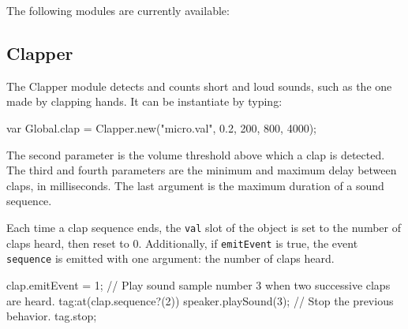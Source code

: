 The following modules are currently available:

\subsection{Clapper}
The Clapper module detects and counts short and loud sounds, such as the one
made by clapping hands. It can be instantiate by typing:

\begin{urbiunchecked}
var Global.clap = Clapper.new("micro.val", 0.2, 200, 800, 4000);
\end{urbiunchecked}

The second parameter is the volume threshold above which a clap is detected.
The third and fourth parameters are the minimum and maximum delay between
claps, in milliseconds. The last argument is the maximum duration of a sound
sequence.

Each time a clap sequence ends, the \lstinline|val| slot of the object is
set to the number of claps heard, then reset to 0.  Additionally, if
\lstinline|emitEvent| is true, the event \lstinline|sequence| is emitted
with one argument: the number of claps heard.

\begin{urbiunchecked}
clap.emitEvent = 1;
// Play sound sample number 3 when two successive claps are heard.
tag:at(clap.sequence?(2))
  speaker.playSound(3);
// Stop the previous behavior.
tag.stop;
\end{urbiunchecked}


